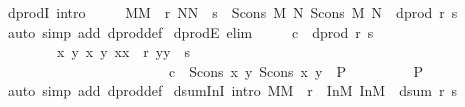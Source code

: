 \begin{isabellebody}
\isanewline
\isanewline
{}\isamarkupfalse%
\ dprodI\ {\isacharbrackleft}intro{\isacharbang}{\isacharbrackright}{\isacharcolon}\ \isanewline
\ \ \ \ {\isachardoublequoteopen}{\isasymlbrakk}{\isacharparenleft}M{\isacharcomma}M{\isacharprime}{\isacharparenright}\ {\isasymin}\ r{\isacharsemicolon}\ {\isacharparenleft}N{\isacharcomma}N{\isacharprime}{\isacharparenright}\ {\isasymin}\ s{\isasymrbrakk}\ {\isasymLongrightarrow}\ {\isacharparenleft}Scons\ M\ N{\isacharcomma}\ Scons\ M{\isacharprime}\ N{\isacharprime}{\isacharparenright}\ {\isasymin}\ dprod\ r\ s{\isachardoublequoteclose}\isanewline
%
\isadelimproof
%
\endisadelimproof
%
\isatagproof
{}\isamarkupfalse%
\ {\isacharparenleft}auto\ simp\ add{\isacharcolon}\ dprod{\isacharunderscore}def{\isacharparenright}%
\endisatagproof
{\isafoldproof}%
%
\isadelimproof
\isanewline
%
\endisadelimproof
\isanewline
\isanewline
{}\isamarkupfalse%
\ dprodE\ {\isacharbrackleft}elim{\isacharbang}{\isacharbrackright}{\isacharcolon}\ \isanewline
\ \ \ \ {\isachardoublequoteopen}{\isasymlbrakk}c\ {\isasymin}\ dprod\ r\ s{\isacharsemicolon}\ \ \ \isanewline
\ \ \ \ \ \ \ \ {\isasymAnd}x\ y\ x{\isacharprime}\ y{\isacharprime}{\isachardot}\ {\isasymlbrakk}{\isacharparenleft}x{\isacharcomma}x{\isacharprime}{\isacharparenright}\ {\isasymin}\ r{\isacharsemicolon}\ {\isacharparenleft}y{\isacharcomma}y{\isacharprime}{\isacharparenright}\ {\isasymin}\ s{\isacharsemicolon}\ \ \isanewline
\ \ \ \ \ \ \ \ \ \ \ \ \ \ \ \ \ \ \ \ \ \ \ \ c\ {\isacharequal}\ {\isacharparenleft}Scons\ x\ y{\isacharcomma}\ Scons\ x{\isacharprime}\ y{\isacharprime}{\isacharparenright}{\isasymrbrakk}\ {\isasymLongrightarrow}\ P\ \ \isanewline
\ \ \ \ \ {\isasymrbrakk}\ {\isasymLongrightarrow}\ P{\isachardoublequoteclose}\isanewline
%
\isadelimproof
%
\endisadelimproof
%
\isatagproof
{}\isamarkupfalse%
\ {\isacharparenleft}auto\ simp\ add{\isacharcolon}\ dprod{\isacharunderscore}def{\isacharparenright}%
\endisatagproof
{\isafoldproof}%
%
\isadelimproof
\isanewline
%
\endisadelimproof
\isanewline
\isanewline
\isanewline
\isanewline
{}\isamarkupfalse%
\ dsum{\isacharunderscore}In{}I\ {\isacharbrackleft}intro{\isacharbrackright}{\isacharcolon}\ {\isachardoublequoteopen}{\isacharparenleft}M{\isacharcomma}M{\isacharprime}{\isacharparenright}\ {\isasymin}\ r\ {\isasymLongrightarrow}\ {\isacharparenleft}In{}{\isacharparenleft}M{\isacharparenright}{\isacharcomma}\ In{}{\isacharparenleft}M{\isacharprime}{\isacharparenright}{\isacharparenright}\ {\isasymin}\ dsum\ r\ s{\isachardoublequoteclose}\isanewline

\end{isabellebody}
